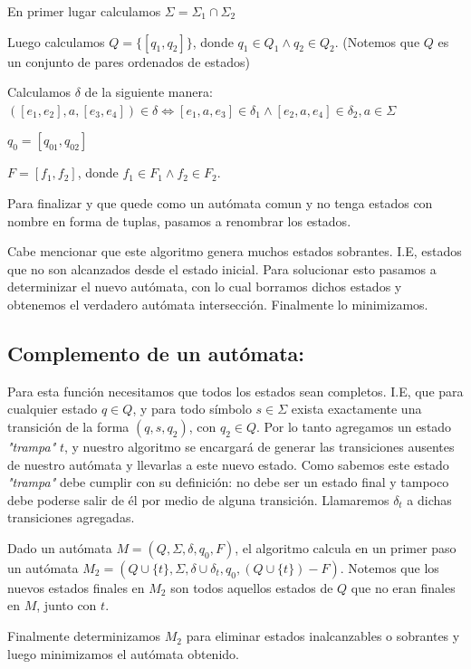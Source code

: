 En primer lugar calculamos $\Sigma = \Sigma_{1} \cap \Sigma_{2}$

Luego calculamos $Q = \{[q_{1},q_{2}]\}$, donde $q_{1} \in Q_{1} \wedge q_{2} \in Q_{2}$.
(Notemos que $Q$ es un conjunto de pares ordenados de estados)

Calculamos $\delta$ de la siguiente manera:
$([e_{1},e_{2}],a,[e_{3},e_{4}]) \in \delta \iff [e_{1},a,e_{3}] \in \delta_{1} \wedge [e_{2},a,e_{4}] \in \delta_{2}, a \in \Sigma$

$q_{0} = [q_{01},q_{02}]$

$F = [f_{1},f_{2}]$, donde $f_{1} \in F_{1} \wedge f_{2} \in F_{2}$.

Para finalizar y que quede como un autómata comun y no tenga estados con nombre en forma de tuplas, pasamos a renombrar los estados.

Cabe mencionar que este algoritmo genera muchos estados sobrantes. I.E, estados que no son alcanzados desde el estado inicial. Para solucionar esto pasamos a determinizar el nuevo autómata, con lo cual borramos dichos estados y obtenemos el verdadero autómata intersección. Finalmente lo minimizamos.

\subsection{Complemento de un autómata:}
Para esta función necesitamos que todos los estados sean completos. I.E, que para cualquier estado $q \in Q$, y para todo símbolo $s \in \Sigma$ exista exactamente una transición de la forma $(q,s,q_{2})$, con $q_{2} \in Q$. Por lo tanto agregamos un estado \textit{"trampa"} $t$, y nuestro algoritmo se encargará de generar las transiciones ausentes de nuestro autómata y llevarlas a este nuevo estado. Como sabemos este estado \textit{"trampa"} debe cumplir con su definición: no debe ser un estado final y tampoco debe poderse salir de él por medio de alguna transición. Llamaremos $\delta_{t}$ a dichas transiciones agregadas.

Dado un autómata $M = (Q,\Sigma,\delta,q_{0},F)$, el algoritmo calcula en un primer paso un autómata $M_{2} = (Q \cup \{t\}, \Sigma, \delta \cup \delta_{t}, q_{0}, (Q \cup \{t\}) - F) $. Notemos que los nuevos estados finales en $M_{2}$ son todos aquellos estados de $Q$ que no eran finales en $M$, junto con $t$.

Finalmente determinizamos $M_{2}$ para eliminar estados inalcanzables o sobrantes y luego minimizamos el autómata obtenido.

